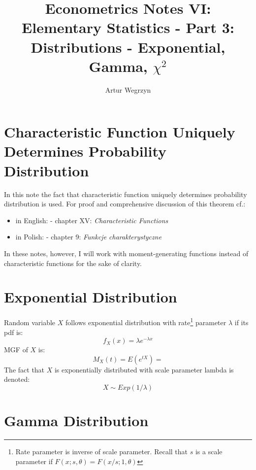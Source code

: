 \documentclass[12pt]{article}
\begin{document}
\title{Econometrics Notes VI: Elementary Statistics - Part 3: Distributions - Exponential, \\ Gamma, $\chi^2$}
\author{Artur Wegrzyn}
\maketitle


\tableofcontents


\section{Characteristic Function Uniquely Determines Probability Distribution}
In this note the fact that characteristic function uniquely determines probability distribution is used. 
For proof and comprehensive discussion of this theorem cf.:
\begin{itemize}
\item in English: \cite{feller_probability_vol2} - chapter XV: \textit{Characteristic Functions}
\item in Polish: \cite{jakubowski_sztencel} - chapter 9: \textit{Funkcje charakterystyczne}
\end{itemize}
In these notes, however, I will work with moment-generating functions instead of characteristic functions 
for the sake of clarity.

\section{Exponential Distribution}
Random variable $X$ follows exponential distribution with rate\footnote{Rate parameter is inverse of scale 
parameter. Recall that $s$ is a scale parameter if $F(x; s, \theta) = F(x/s; 1, \theta)$} parameter $\lambda$
if its pdf is:
\begin{equation*}
f_{X}(x) = \lambda e^{-\lambda x}
\end{equation*}
MGF of $X$ is:
\begin{equation*}
M_{X}(t) = E(e^{tX}) = 
\end{equation*}
The fact that $X$ is exponentially distributed with scale parameter lambda is denoted:
\begin{equation*}
X \sim Exp(1/\lambda)
\end{equation*}


\section{Gamma Distribution}
\end{document}
